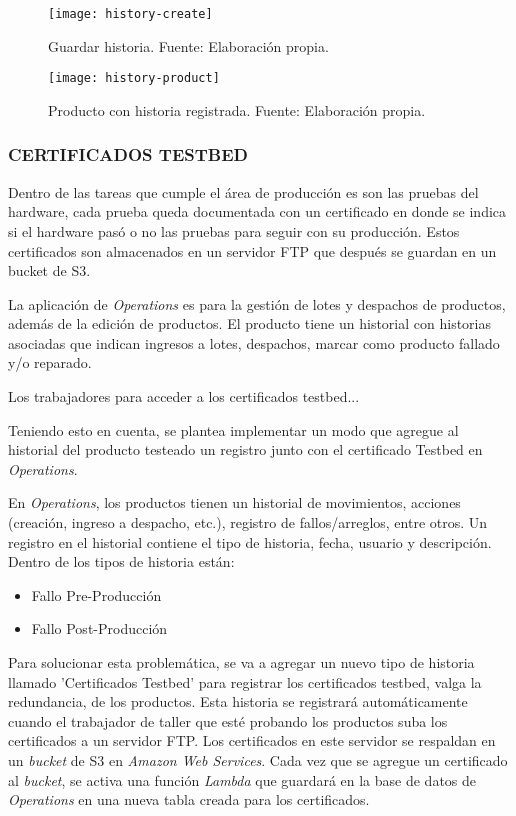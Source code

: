 \begin{figure}[H]
	\centering
	\texttt{[image: history-create]}
	\caption{\label{fig:history-create} Guardar historia. Fuente: Elaboración propia.}
\end{figure}

\begin{figure}[H]
	\centering
	\texttt{[image: history-product]}
	\caption{\label{fig:history-product} Producto con historia registrada. Fuente: Elaboración propia.}
\end{figure}

\iffalse
\subsubsection{CERTIFICADOS TESTBED}

Dentro de las tareas que cumple el área de producción es son las pruebas del hardware, cada prueba queda documentada con
un certificado en donde se indica si el hardware pasó o no las pruebas para seguir con su producción. Estos certificados son
almacenados en un servidor FTP que después se guardan en un bucket de S3.

La aplicación de \textit{Operations} es para la gestión de lotes y despachos de productos, además de la edición de productos.
El producto tiene un historial con historias asociadas que indican ingresos a lotes, despachos, marcar como producto fallado y/o reparado.

Los trabajadores para acceder a los certificados testbed...

Teniendo esto en cuenta, se plantea implementar un modo que agregue al historial del producto testeado un registro junto con el certificado Testbed en \textit{Operations}.

En \textit{Operations}, los productos tienen un historial de movimientos, acciones (creación, ingreso a despacho, etc.), registro de fallos/arreglos, entre otros.
Un registro en el historial contiene el tipo de historia, fecha, usuario y descripción. Dentro de los tipos de historia están:
\begin{itemize}
    \item Fallo Pre-Producción
    \item Fallo Post-Producción
\end{itemize}

Para solucionar esta problemática, se va a agregar un nuevo tipo de historia llamado 'Certificados Testbed' para registrar los certificados testbed, valga la redundancia, de los productos.
Esta historia se registrará automáticamente cuando el trabajador de taller que esté probando los productos suba los certificados a un servidor FTP. Los certificados en este servidor se respaldan en un \textit{bucket} de S3 en \textit{Amazon Web Services}.
Cada vez que se agregue un certificado al \textit{bucket}, se activa una función \textit{Lambda} que guardará en la base de datos de \textit{Operations} en una nueva tabla creada para los certificados.

